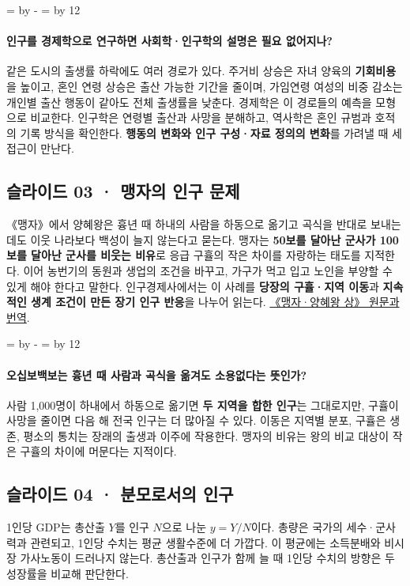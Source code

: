 \documentclass[10pt,a4paper]{article}
\newcommand{\ReserveQuestionSpace}{%
  \par\begingroup
  \dimen0=\pagegoal \advance\dimen0 by -\pagetotal
  \dimen2=\baselineskip \multiply\dimen2 by 12
  \ifdim\dimen0<\dimen2 \newpage\fi
  \endgroup}
\begin{document}
\ReserveQuestionSpace
\paragraph{인구를 경제학으로 연구하면 사회학·인구학의 설명은 필요 없어지나?}
같은 도시의 출생률 하락에도 여러 경로가 있다. 주거비 상승은 자녀 양육의 \textbf{기회비용}을 높이고, 혼인 연령 상승은 출산 가능한 기간을 줄이며, 가임연령 여성의 비중 감소는 개인별 출산 행동이 같아도 전체 출생률을 낮춘다. 경제학은 이 경로들의 예측을 모형으로 비교한다. 인구학은 연령별 출산과 사망을 분해하고, 역사학은 혼인 규범과 호적의 기록 방식을 확인한다. \textbf{행동의 변화와 인구 구성·자료 정의의 변화}를 가려낼 때 세 접근이 만난다.\par

\subsection{슬라이드 03 · 맹자의 인구 문제}
《맹자》에서 양혜왕은 흉년 때 하내의 사람을 하동으로 옮기고 곡식을 반대로 보내는데도 이웃 나라보다 백성이 늘지 않는다고 묻는다. 맹자는 \textbf{50보를 달아난 군사가 100보를 달아난 군사를 비웃는 비유}로 응급 구휼의 작은 차이를 자랑하는 태도를 지적한다. 이어 농번기의 동원과 생업의 조건을 바꾸고, 가구가 먹고 입고 노인을 부양할 수 있게 해야 한다고 말한다. 인구경제사에서는 이 사례를 \textbf{당장의 구휼·지역 이동}과 \textbf{지속적인 생계 조건이 만든 장기 인구 반응}을 나누어 읽는다. \href{https://dh.aks.ac.kr/jsg/index.php/\%28Translation\%29\_\%E4\%BB\%A5\%E4\%BA\%94\%E5\%8D\%81\%E6\%AD\%A5\%E7\%AC\%91\%E4\%B8\%80\%E7\%99\%BE\%E6\%AD\%A5}{《맹자·양혜왕 상》 원문과 번역}.\par

\ReserveQuestionSpace
\paragraph{오십보백보는 흉년 때 사람과 곡식을 옮겨도 소용없다는 뜻인가?}
사람 1,000명이 하내에서 하동으로 옮기면 \textbf{두 지역을 합한 인구}는 그대로지만, 구휼이 사망을 줄이면 다음 해 전국 인구는 더 많아질 수 있다. 이동은 지역별 분포, 구휼은 생존, 평소의 통치는 장래의 출생과 이주에 작용한다. 맹자의 비유는 왕의 비교 대상이 작은 구휼의 차이에 머문다는 지적이다.\par

\subsection{슬라이드 04 · 분모로서의 인구}
1인당 GDP는 총산출 $Y$를 인구 $N$으로 나눈 $y=Y/N$이다. 총량은 국가의 세수·군사력과 관련되고, 1인당 수치는 평균 생활수준에 더 가깝다. 이 평균에는 소득분배와 비시장 가사노동이 드러나지 않는다. 총산출과 인구가 함께 늘 때 1인당 수치의 방향은 두 성장률을 비교해 판단한다.\par
\end{document}
